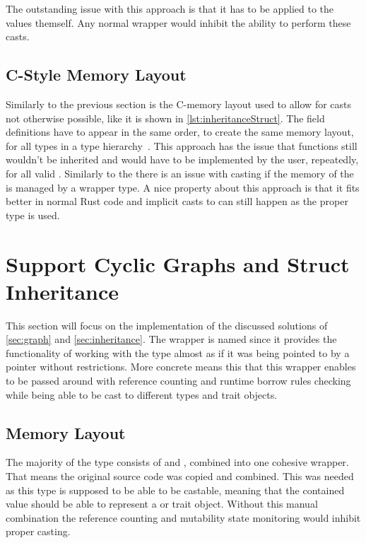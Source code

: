 \documentclass[thesis]{subfiles}
\begin{document}
    The outstanding issue with this approach is that it has to be applied to the values themself.
    Any normal wrapper would inhibit the ability to perform these casts.

  \subsection{C-Style Memory Layout}
    Similarly to the previous section is the C-memory layout used to allow for casts not otherwise possible, like it is shown in \autoref{lst:inheritanceStruct}.
    The field definitions have to appear in the same order, to create the same memory layout, for all types in a type hierarchy~\autocite[repr(C)]{rust-nom}.
    This approach has the issue that functions still wouldn't be inherited and would have to be implemented by the user, repeatedly, for all valid \structs.
    Similarly to the \traits there is an issue with casting if the memory of the \struct is managed by a wrapper type.
    A nice property about this approach is that it fits better in normal Rust code and implicit casts to  can still happen as the proper type is used.


\section{Support Cyclic Graphs and Struct Inheritance}
  This section will focus on the implementation of the discussed solutions of \autoref{sec:graph} and \autoref{sec:inheritance}.
  The wrapper is named \PtrT since it provides the functionality of working with the type \T almost as if it was being pointed to by a pointer without restrictions.
  More concrete means this that this wrapper enables \T to be passed around with reference counting and runtime borrow rules checking while being able to be cast to different types and trait objects.

  \subsection{Memory Layout}
    The majority of the \PtrT type consists of \RcT and \RefCellT, combined into one cohesive wrapper.
    That means the original source code was copied and combined.
    This was needed as this type is supposed to be able to be castable, meaning that the contained value should be able to represent a \struct or trait object.
    Without this manual combination the reference counting and mutability state monitoring would inhibit proper casting.
\end{document}
